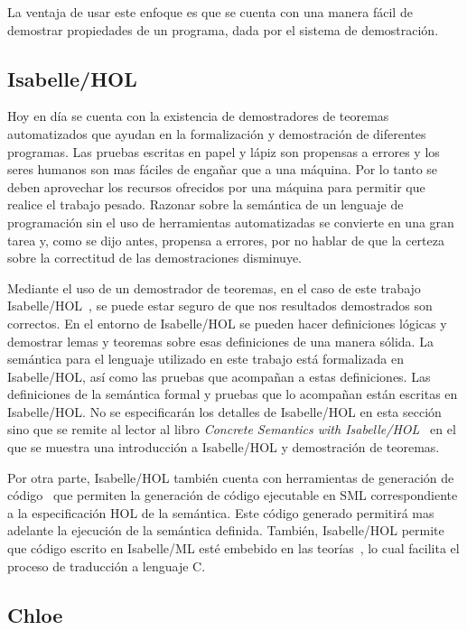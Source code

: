 La ventaja de usar este enfoque es que se cuenta con una manera fácil de demostrar propiedades de un programa, dada por el sistema de demostración.


\subsection{Isabelle/HOL}\label{section:isabelle/hol}

Hoy en día se cuenta con la existencia de demostradores de teoremas automatizados que ayudan en la formalización y demostración de diferentes programas.
Las pruebas escritas en papel y lápiz son propensas a errores y los seres humanos son mas fáciles de engañar que a una máquina.
Por lo tanto se deben aprovechar los recursos ofrecidos por una máquina para permitir que realice el trabajo pesado.
Razonar sobre la semántica de un lenguaje de programación sin el uso de herramientas automatizadas se convierte en una gran tarea y, como se dijo antes, propensa a errores, por no hablar de que la certeza sobre la correctitud de las demostraciones disminuye.

Mediante el uso de un demostrador de teoremas, en el caso de este trabajo Isabelle/HOL~\citep{isabelle-tutorial}, se puede estar seguro de que nos resultados demostrados son correctos.
En el entorno de Isabelle/HOL se pueden hacer definiciones lógicas y demostrar lemas y teoremas sobre esas definiciones de una manera sólida.
La semántica para el lenguaje utilizado en este trabajo está formalizada en Isabelle/HOL, así como las pruebas que acompañan a estas definiciones.
Las definiciones de la semántica formal y pruebas que lo acompañan están escritas en Isabelle/HOL.
No se especificarán los detalles de Isabelle/HOL en esta sección sino que se remite al lector al libro \textit{Concrete Semantics with Isabelle/HOL}~\citep{nipkow} en el que se muestra una introducción a Isabelle/HOL y demostración de teoremas.

Por otra parte, Isabelle/HOL también cuenta con herramientas de generación de código~\citep{isabelle-codegen} que permiten la generación de código ejecutable en SML correspondiente a la especificación HOL de la semántica.
Este código generado permitirá mas adelante la ejecución de la semántica definida.
También, Isabelle/HOL permite que código escrito en Isabelle/ML esté embebido en las teorías~\citep{isabelle-implementation}, lo cual facilita el proceso de traducción a lenguaje C.

\subsection{Chloe}\label{subsection:chloe}

